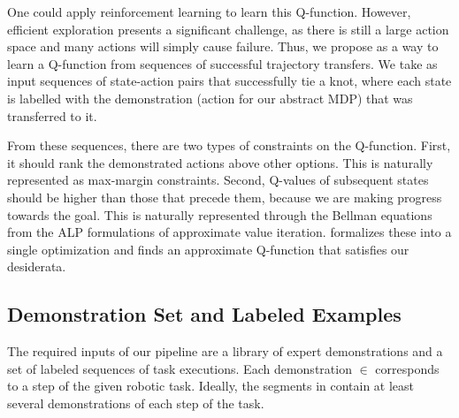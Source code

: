 One could apply reinforcement learning to learn this
Q-function. However, efficient exploration presents a significant
challenge, as there is still a large action space and many actions
will simply cause failure. Thus, we propose \mmql{} as a way to learn
a Q-function from sequences of successful trajectory transfers. We
take as input sequences of state-action pairs that successfully tie a
knot, where each state is labelled with the demonstration (action for
our abstract MDP) that was transferred to it.

From these sequences, there are two types of constraints on the
Q-function. First, it should rank the demonstrated actions above other
options. This is naturally represented as max-margin
constraints. Second, Q-values of subsequent states should be higher
than those that precede them, because we are making progress towards
the goal. This is naturally represented through the Bellman equations
from the ALP formulations of approximate value iteration. \mmql{}
formalizes these into a single optimization and finds an approximate
Q-function that satisfies our desiderata.






\subsection{Demonstration Set and Labeled Examples}

The required inputs of our pipeline are a library \demoset{}
of expert demonstrations and a set  of labeled sequences of
task executions.
Each demonstration \demovar{} $\in$ \demoset{} corresponds to a step
of the given robotic task. Ideally, the segments in \demoset{} contain
at least several demonstrations of each step of the task.

